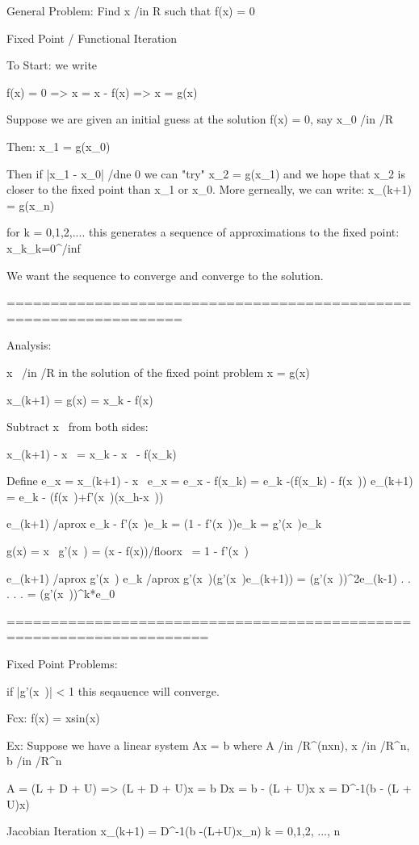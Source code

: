 General Problem: Find x /in R such that f(x) = 0

Fixed Point / Functional Iteration

To Start: we write

	f(x) = 0 => x = x - f(x)
			 => x = g(x)

Suppose we are given an initial guess at the solution f(x) = 0, say x_0 /in /R

Then:
	x_1 = g(x_0)

Then if |x_1 - x_0| /dne 0 we can "try"
	x_2 = g(x_1)
and we hope that x_2 is closer to the fixed point than x_1 or x_0. More gerneally, we can write:
	x_(k+1) = g(x_n)

for k = 0,1,2,.... this generates a sequence of approximations to the fixed point:
	{x_k}_k=0^/inf

We want the sequence to converge and converge to the solution.

==================================================================

Analysis:

	x~ /in /R in the solution of the fixed point problem x = g(x)

	x_(k+1) = g(x) = x_k - f(x)

	Subtract x~ from both sides:

		x_(k+1) - x~ = x_k - x~ - f(x_k)

	Define e_x = x_(k+1) - x~
		   e_x = e_x - f(x_k)
		       = e_k -(f(x_k) - f(x~))
		   e_(k+1) = e_k - (f(x~)+f'(x~)(x_h-x~))

		   e_(k+1) /aprox e_k - f'(x~)e_k
					= (1 - f'(x~))e_k = g'(x~)e_k

				g(x) = x~
				g'(x~) = (x - f(x))/floorx~ = 1 - f'(x~)

		  e_(k+1) /aprox g'(x~) e_k
				  /aprox g'(x~)(g'(x~)e_(k+1)) = (g'(x~))^2e_(k-1)
				  .
				  .
				  .
				  .
				  .
				  = (g'(x~))^k*e_0

=====================================================================

Fixed Point Problems:

if |g'(x~)| < 1 this seqauence will converge.

	Fcx:	f(x) = xsin(x)

Ex: Suppose we have a linear system Ax = b where A /in /R^(nxn), x /in /R^n, b /in /R^n

	A = (L + D + U) => (L + D + U)x = b
	Dx = b - (L + U)x
	 x = D^-1(b - (L + U)x)

	Jacobian Iteration
		x_(k+1) = D^-1(b -(L+U)x_n)
		k = 0,1,2, ..., n

